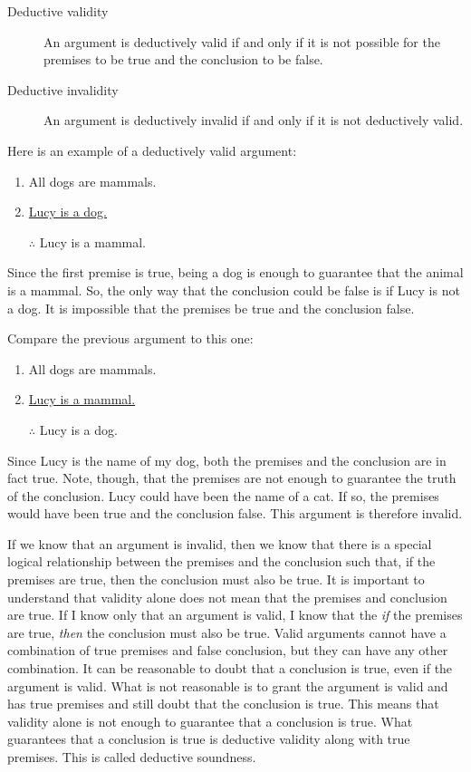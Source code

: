 \documentclass[../logic-text.tex]{subfiles}
\begin{document}
\begin{description}
  \item[Deductive validity] An argument is deductively valid if and only if it is not possible for the premises to be true and the conclusion to be false.
  \item[Deductive invalidity] An argument is deductively invalid if and only if it is not deductively valid. 
\end{description}


Here is an example of a deductively valid argument:

\begin{enumerate}
	\item All dogs are mammals.
	\item \underline{Lucy is a dog.}
	\item [$\therefore$] Lucy is a mammal.
\end{enumerate}


Since the first premise is true, being a dog is enough to guarantee that the animal is a mammal. So, the only way that the conclusion could be false is if Lucy is not a dog. It is impossible that the premises be true and the conclusion false.

Compare the previous argument to this one:

\begin{enumerate}
	\item All dogs are mammals.
	\item \underline{Lucy is a mammal.}
	\item [$\therefore$] Lucy is a dog.
\end{enumerate}

Since Lucy is the name of my dog, both the premises and the conclusion are in fact true. Note, though, that the premises are not enough to guarantee the truth of the conclusion. Lucy could have been the name of a cat. If so, the premises would have been true and the conclusion false. This argument is therefore invalid.

If we know that an argument is invalid, then we know that there is a special logical relationship between the premises and the conclusion such that, if the premises are true, then the conclusion must also be true. It is important to understand that validity alone does not mean that the premises and conclusion are true. If I know only that an argument is valid, I know that the \emph{if} the premises are true, \emph{then} the conclusion must also be true. Valid arguments cannot have a combination of true premises and false conclusion, but they can have any other combination. It can be reasonable to doubt that a conclusion is true, even if the argument is valid. What is not reasonable is to grant the argument is valid and has true premises and still doubt that the conclusion is true. This means that validity alone is not enough to guarantee that a conclusion is true. What guarantees that a conclusion is true is deductive validity along with true premises. This is called deductive soundness.
\end{document}
